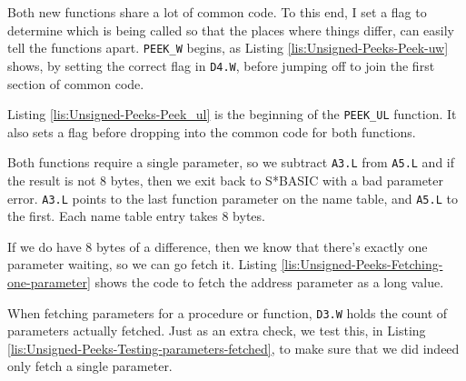 

Both new functions share a lot of common code. To this end, I set
a flag to determine which is being called so that the places where
things differ, can easily tell the functions apart. \texttt{PEEK\_W}
begins, as Listing \ref{lis:Unsigned-Peeks-Peek-uw} shows, by setting
the correct flag in \texttt{D4.W}, before jumping off to join the
first section of common code.



Listing \ref{lis:Unsigned-Peeks-Peek_ul} is the beginning of the
\texttt{PEEK\_UL} function. It also sets a flag before dropping into
the common code for both functions. 



Both functions require a single parameter, so we subtract \texttt{A3.L}
from \texttt{A5.L} and if the result is not 8 bytes, then we exit
back to S{*}BASIC with a bad parameter error. \texttt{A3.L} points
to the last function parameter on the name table, and \texttt{A5.L}
to the first. Each name table entry takes 8 bytes.

If we do have 8 bytes of a difference, then we know that there's exactly
one parameter waiting, so we can go fetch it. Listing \ref{lis:Unsigned-Peeks-Fetching-one-parameter}
shows the code to fetch the address parameter as a long value.



When fetching parameters for a procedure or function, \texttt{D3.W}
holds the count of parameters actually fetched. Just as an extra check,
we test this, in Listing \ref{lis:Unsigned-Peeks-Testing-parameters-fetched},
to make sure that we did indeed only fetch a single parameter.

